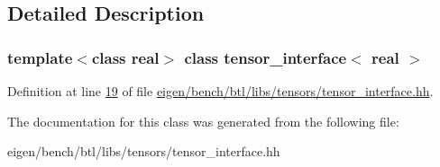 \subsection{Detailed Description}
\subsubsection*{template$<$class real$>$\newline
class tensor\+\_\+interface$<$ real $>$}



Definition at line \hyperlink{eigen_2bench_2btl_2libs_2tensors_2tensor__interface_8hh_source_l00019}{19} of file \hyperlink{eigen_2bench_2btl_2libs_2tensors_2tensor__interface_8hh_source}{eigen/bench/btl/libs/tensors/tensor\+\_\+interface.\+hh}.



The documentation for this class was generated from the following file\+:\begin{DoxyCompactItemize}
\item 
eigen/bench/btl/libs/tensors/tensor\+\_\+interface.\+hh\end{DoxyCompactItemize}
